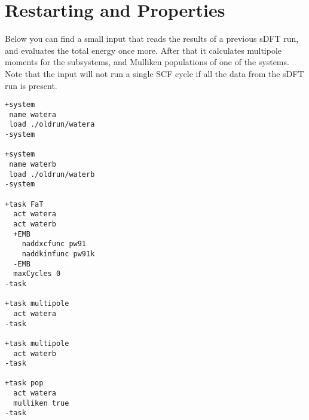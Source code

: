 \section{Restarting and Properties}
Below you can find a small input that reads the results of a previous sDFT run, and evaluates the total energy once more.
After that it calculates multipole moments for the subsystems, and Mulliken populations of one of the systems.
Note that the input will not run a single SCF cycle if all the data from the sDFT run is present.
\begin{lstlisting}
+system
 name watera
 load ./oldrun/watera
-system

+system
 name waterb
 load ./oldrun/waterb
-system

+task FaT
  act watera
  act waterb
  +EMB
    naddxcfunc pw91
    naddkinfunc pw91k
  -EMB
  maxCycles 0
-task

+task multipole
  act watera
-task

+task multipole
  act waterb
-task

+task pop
  act watera
  mulliken true
-task
\end{lstlisting}

\clearpage
